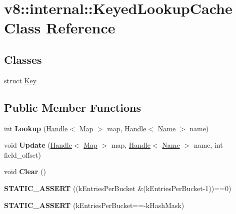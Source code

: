 \hypertarget{classv8_1_1internal_1_1_keyed_lookup_cache}{}\section{v8\+:\+:internal\+:\+:Keyed\+Lookup\+Cache Class Reference}
\label{classv8_1_1internal_1_1_keyed_lookup_cache}
\subsection*{Classes}
\begin{DoxyCompactItemize}
\item 
struct \hyperlink{structv8_1_1internal_1_1_keyed_lookup_cache_1_1_key}{Key}
\end{DoxyCompactItemize}
\subsection*{Public Member Functions}
\begin{DoxyCompactItemize}
\item 
int {\bfseries Lookup} (\hyperlink{classv8_1_1internal_1_1_handle}{Handle}$<$ \hyperlink{classv8_1_1internal_1_1_map}{Map} $>$ map, \hyperlink{classv8_1_1internal_1_1_handle}{Handle}$<$ \hyperlink{classv8_1_1internal_1_1_name}{Name} $>$ name)\hypertarget{classv8_1_1internal_1_1_keyed_lookup_cache_a610bd0b8305231bf0ad14b12b1027329}{}\label{classv8_1_1internal_1_1_keyed_lookup_cache_a610bd0b8305231bf0ad14b12b1027329}

\item 
void {\bfseries Update} (\hyperlink{classv8_1_1internal_1_1_handle}{Handle}$<$ \hyperlink{classv8_1_1internal_1_1_map}{Map} $>$ map, \hyperlink{classv8_1_1internal_1_1_handle}{Handle}$<$ \hyperlink{classv8_1_1internal_1_1_name}{Name} $>$ name, int field\+\_\+offset)\hypertarget{classv8_1_1internal_1_1_keyed_lookup_cache_aa79fc50d288ad350be2eab3409e6a4be}{}\label{classv8_1_1internal_1_1_keyed_lookup_cache_aa79fc50d288ad350be2eab3409e6a4be}

\item 
void {\bfseries Clear} ()\hypertarget{classv8_1_1internal_1_1_keyed_lookup_cache_a184b47e6d6636f89403e34e339885264}{}\label{classv8_1_1internal_1_1_keyed_lookup_cache_a184b47e6d6636f89403e34e339885264}

\item 
{\bfseries S\+T\+A\+T\+I\+C\+\_\+\+A\+S\+S\+E\+RT} ((k\+Entries\+Per\+Bucket \&(k\+Entries\+Per\+Bucket-\/1))==0)\hypertarget{classv8_1_1internal_1_1_keyed_lookup_cache_ad8ed15b794045bc9bcfd8fda6e1a1ee3}{}\label{classv8_1_1internal_1_1_keyed_lookup_cache_ad8ed15b794045bc9bcfd8fda6e1a1ee3}

\item 
{\bfseries S\+T\+A\+T\+I\+C\+\_\+\+A\+S\+S\+E\+RT} (k\+Entries\+Per\+Bucket==-\/k\+Hash\+Mask)\hypertarget{classv8_1_1internal_1_1_keyed_lookup_cache_af353055f81bb5be7e711efed5b03d139}{}\label{classv8_1_1internal_1_1_keyed_lookup_cache_af353055f81bb5be7e711efed5b03d139}

\end{DoxyCompactItemize}
